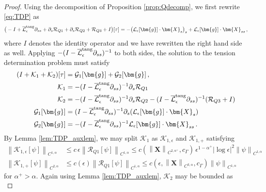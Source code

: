 \documentclass[11pt,reqno]{amsart}
\newcommand{\X}{\bm{X}}
\newcommand{\p}{\partial}
\newcommand{\abs}[1]{\left\lvert #1 \right\rvert}
\newcommand{\norm}[1]{\left\lVert #1 \right\rVert}
\newcommand{\mc}[1]{\mathcal{#1}}
\theoremstyle{definition}
\begin{document}
\begin{proof}
Using the decomposition of Proposition \ref{prop:Qdecomp}, we first rewrite \eqref{eq:TDP} as
\begin{equation}
  \big(-I+ \overline{\mc{L}}_\epsilon^{\rm tang}\p_{ss} +\p_s\mc{R}_{Q1} +\p_s\mc{R}_{Q2} +\mc{R}_{Q3}+I\big)[\tau] 
  = -\big(\mc{L}_\epsilon[\bm{g}]\cdot\X_s\big)_s + \mc{L}_\epsilon[\bm{g}]\cdot\X_{ss}\,,
\end{equation}
where $I$ denotes the identity operator and we have rewritten the right hand side as well. Applying $-(I-\overline{\mc{L}}_\epsilon^{\rm tang}\p_{ss})^{-1}$ to both sides, the solution to the tension determination problem must satisfy
\begin{equation}\label{eq:rewrite1} 
\begin{aligned}
  (I+ \mc{K}_1 + \mc{K}_2)[\tau] &= \mc{G}_1[\bm{g}] + \mc{G}_2[\bm{g}]\,,\\
  \mc{K}_1 &= -(I- \overline{\mc{L}}_\epsilon^{\rm tang}\p_{ss})^{-1}\p_s\mc{R}_{Q1} \\
  \mc{K}_2 &= -(I- \overline{\mc{L}}_\epsilon^{\rm tang}\p_{ss})^{-1}\p_s\mc{R}_{Q2}- (I- \overline{\mc{L}}_\epsilon^{\rm tang}\p_{ss})^{-1}(\mc{R}_{Q3}+I) \\
  \mc{G}_1[\bm{g}] &= (I- \overline{\mc{L}}_\epsilon^{\rm tang}\p_{ss})^{-1}\p_s(\mc{L}_\epsilon[\bm{g}]\cdot\X_s)\\
  \mc{G}_2[\bm{g}] &= -(I- \overline{\mc{L}}_\epsilon^{\rm tang}\p_{ss})^{-1}\mc{L}_\epsilon[\bm{g}]\cdot\X_{ss}\,.
\end{aligned}
\end{equation}
%
%
By Lemma \ref{lem:TDP_auxlem}, we may split $\mc{K}_1$ as $\mc{K}_{1,\epsilon}$ and $\mc{K}_{1,+}$ satisfying 
\begin{equation}
\begin{aligned}
  \norm{\mc{K}_{1,\epsilon}[\psi]}_{C^{1,\alpha}} &\le c\,\epsilon\norm{\mc{R}_{Q1}[\psi]}_{C^{1,\alpha}} \le c(\norm{\X}_{C^{2,\alpha^+}},c_\Gamma)\,\epsilon^{1-\alpha^+}\abs{\log\epsilon}^2\norm{\psi}_{C^{1,\alpha}} \\
  \norm{\mc{K}_{1,+}[\psi]}_{C^{2,\alpha}} &\le c(\epsilon)\norm{\mc{R}_{Q1}[\psi]}_{C^{1,\alpha}} \le c(\epsilon,\norm{\X}_{C^{3,\alpha}},c_\Gamma)\norm{\psi}_{C^{1,\alpha}}
\end{aligned}
\end{equation}
for $\alpha^+>\alpha$.
%
Again using Lemma \ref{lem:TDP_auxlem}, $\mc{K}_2$ may be bounded as 
\begin{equation}

\end{equation}
\end{proof}
\end{document}
